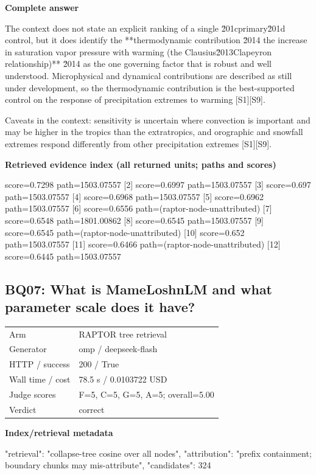 \documentclass[10pt]{article}
\begin{document}
\textbf{Complete answer}
\begin{AnswerText}
The context does not state an explicit ranking of a single \u201cprimary\u201d control, but it does identify the **thermodynamic contribution \u2014 the increase in saturation vapor pressure with warming (the Clausius\u2013Clapeyron relationship)** \u2014 as the one governing factor that is robust and well understood. Microphysical and dynamical contributions are described as still under development, so the thermodynamic contribution is the best-supported control on the response of precipitation extremes to warming [S1][S9].

Caveats in the context: sensitivity is uncertain where convection is important and may be higher in the tropics than the extratropics, and orographic and snowfall extremes respond differently from other precipitation extremes [S1][S9].
\end{AnswerText}

\textbf{Retrieved evidence index (all returned units; paths and scores) }
\begin{EvidenceText}
[1] score=0.7298 path=1503.07557
[2] score=0.6997 path=1503.07557
[3] score=0.697 path=1503.07557
[4] score=0.6968 path=1503.07557
[5] score=0.6962 path=1503.07557
[6] score=0.6556 path=(raptor-node-unattributed)
[7] score=0.6548 path=1801.00862
[8] score=0.6545 path=1503.07557
[9] score=0.6545 path=(raptor-node-unattributed)
[10] score=0.652 path=1503.07557
[11] score=0.6466 path=(raptor-node-unattributed)
[12] score=0.6445 path=1503.07557
\end{EvidenceText}
\subsection{BQ07: What is MameLoshnLM and what parameter scale does it have?}
\begin{tabular}{@{}ll@{}}
Arm & RAPTOR tree retrieval\\
Generator & omp / deepseek-flash\\
HTTP / success & 200 / True\\
Wall time / cost & 78.5 s / 0.0103722 USD\\
Judge scores & F=5, C=5, G=5, A=5; overall=5.00\\
Verdict & correct\\
\end{tabular}

\textbf{Index/retrieval metadata}
\begin{EvidenceText}
{
  "retrieval": "collapse-tree cosine over all nodes",
  "attribution": "prefix containment; boundary chunks may mis-attribute",
  "candidates": 324
}
\end{EvidenceText}
\end{document}
